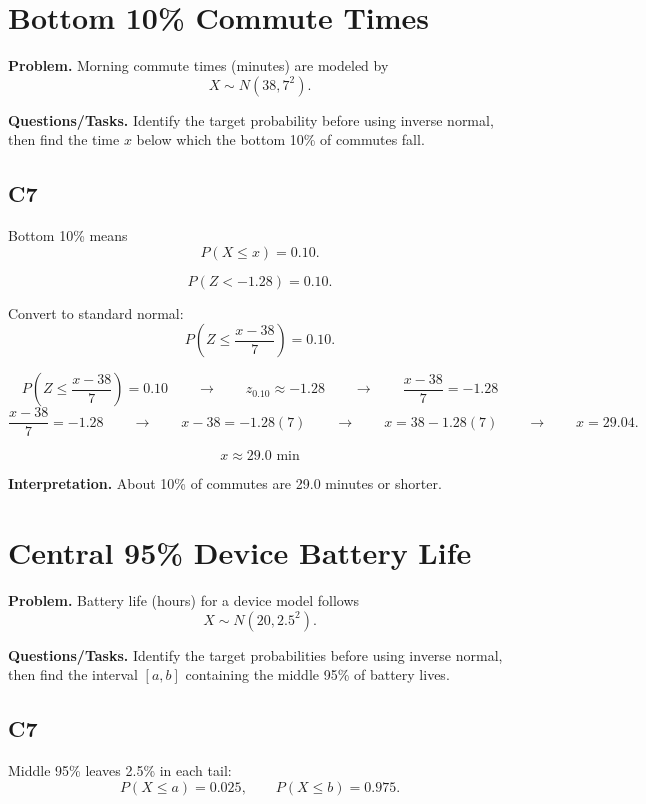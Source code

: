 	\section{Bottom 10\% Commute Times}
	
	\textbf{Problem.} Morning commute times (minutes) are modeled by
	\[
	X \sim N(38, 7^2).
	\]
	
	\textbf{Questions/Tasks.} Identify the target probability before using inverse normal, then find the time $x$ below which the bottom 10\% of commutes fall.
	
	\subsection*{C7}
	
	Bottom 10\% means
	\[
	P(X \leq x) = 0.10.
	\]
	
	\[
	P(Z<-1.28)=0.10.
	\]
	
	
	Convert to standard normal:
	\[
	P\left(Z \leq \frac{x - 38}{7}\right) = 0.10.
	\]
	
	\[
	P\left(Z \leq \frac{x - 38}{7}\right)=0.10
	\qquad \longrightarrow \qquad
	z_{0.10}\approx -1.28
	\qquad \longrightarrow \qquad
	\frac{x - 38}{7}=-1.28
	\]
	\[
	\frac{x - 38}{7}=-1.28
	\qquad \longrightarrow \qquad
	x-38=-1.28(7)
	\qquad \longrightarrow \qquad
	x=38-1.28(7)
	\qquad \longrightarrow \qquad
	x=29.04.
	\]
	
	\[
	x \approx 29.0\text{ min}
	\]
	
	\textbf{Interpretation.} About 10\% of commutes are 29.0 minutes or shorter.
	
	\section{Central 95\% Device Battery Life}
	
	\textbf{Problem.} Battery life (hours) for a device model follows
	\[
	X \sim N(20, 2.5^2).
	\]
	
	\textbf{Questions/Tasks.} Identify the target probabilities before using inverse normal, then find the interval $[a,b]$ containing the middle 95\% of battery lives.
	
	\subsection*{C7}
	
	Middle 95\% leaves 2.5\% in each tail:
	\[
	P(X \leq a) = 0.025, \qquad P(X \leq b) = 0.975.
	\]
	
